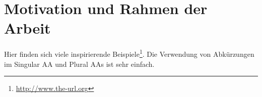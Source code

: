 
\section{Motivation und Rahmen der Arbeit}
\label{sec:motivation}

\blindmathfalse
\Blindtext[3]

Hier finden sich viele inspirierende Beispiele\footnote{\href{http://www.the-url.org}{http://www.the-url.org}}. Die Verwendung von Abkürzungen im Singular \gls{AA} und Plural \glspl{AA} ist sehr einfach.
